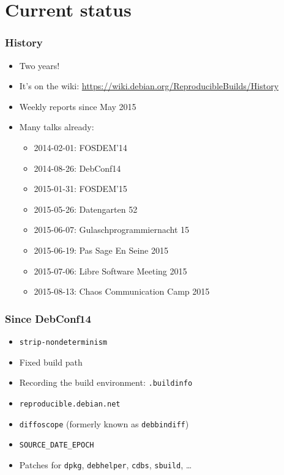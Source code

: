 \documentclass[14pt]{beamer}
\begin{document}
\section{Current status}

\begin{frame}
 \frametitle{History}

 \begin{itemize}
  \item Two years!
  \item It's on the wiki:
    {\small \url{https://wiki.debian.org/ReproducibleBuilds/History}}
  \item Weekly reports since May 2015
  \item Many talks already:
   \begin{itemize}
    \item 2014-02-01: FOSDEM’14
    \item 2014-08-26: DebConf14
    \item 2015-01-31: FOSDEM’15
    \item 2015-05-26: Datengarten 52
    \item 2015-06-07: Gulaschprogrammiernacht 15
    \item 2015-06-19: Pas Sage En Seine 2015
    \item 2015-07-06: Libre Software Meeting 2015
    \item 2015-08-13: Chaos Communication Camp 2015
   \end{itemize}
 \end{itemize}
\end{frame}

\begin{frame}
 \frametitle{Since DebConf14}

 \begin{itemize}
  \item \texttt{strip-nondeterminism}
  \item Fixed build path
  \item Recording the build environment: \texttt{.buildinfo}
  \item \texttt{reproducible.debian.net}
  \item \texttt{diffoscope} (formerly known as \texttt{debbindiff})
  \item \texttt{SOURCE\_DATE\_EPOCH}
  \item Patches for \texttt{dpkg}, \texttt{debhelper}, \texttt{cdbs}, \texttt{sbuild}, …
 \end{itemize}
\end{frame}
\end{document}

